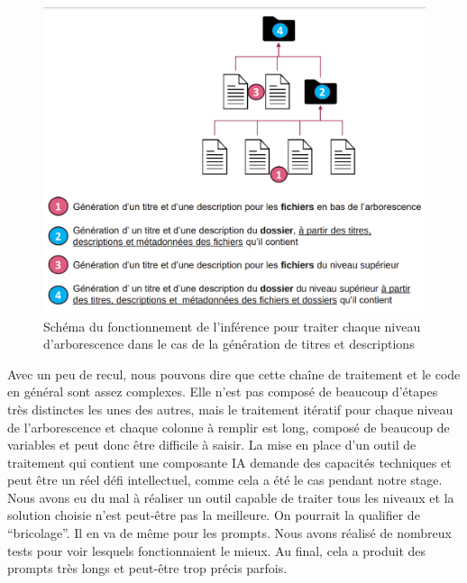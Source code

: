  
\begin{figure}[h!]
	\centerline{\includegraphics[width=12cm]{./media/remplissage_json.png}}
	\caption{Schéma du fonctionnement de l'inférence pour traiter chaque niveau d'arborescence dans le cas de la génération de titres et descriptions}
\end{figure}





Avec un peu de recul, nous pouvons dire que cette chaîne de traitement et le code en général sont assez complexes. Elle n'est pas composé de beaucoup d'étapes très distinctes les unes des autres, 
mais le traitement itératif pour chaque niveau de l'arborescence et chaque colonne à remplir est long, composé de beaucoup de variables et peut donc être difficile à saisir.
La mise en place d'un outil de traitement qui contient une composante IA demande des capacités techniques et peut être un réel défi intellectuel, comme cela a été le cas pendant notre stage.
Nous avons eu du mal à réaliser un outil capable de traiter tous les niveaux et la solution choisie n'est peut-être pas la meilleure.
On pourrait la qualifier de \enquote{bricolage}. Il en va de même pour les prompts. Nous avons réalisé de nombreux tests pour voir lesquels fonctionnaient le mieux. Au final, cela a produit des prompts très longs
 et peut-être trop précis parfois.

